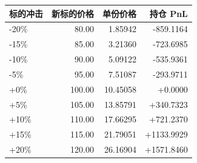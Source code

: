 \begin{tabular}{lrrr}
\toprule
标的冲击 & 新标的价格 & 单份价格 & 持仓 PnL \\
\midrule
-20\% & 80.00 & 1.85942 & -859.1164 \\
-15\% & 85.00 & 3.21360 & -723.6985 \\
-10\% & 90.00 & 5.09122 & -535.9361 \\
-5\% & 95.00 & 7.51087 & -293.9711 \\
+0\% & 100.00 & 10.45058 & +0.0000 \\
+5\% & 105.00 & 13.85791 & +340.7323 \\
+10\% & 110.00 & 17.66295 & +721.2370 \\
+15\% & 115.00 & 21.79051 & +1133.9929 \\
+20\% & 120.00 & 26.16904 & +1571.8460 \\
\bottomrule
\end{tabular}
